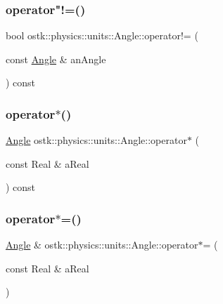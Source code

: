 \subsubsection{\texorpdfstring{operator"!=()}{operator!=()}}
{\footnotesize\ttfamily bool ostk\+::physics\+::units\+::\+Angle\+::operator!= (\begin{DoxyParamCaption}\item[{const \hyperlink{classostk_1_1physics_1_1units_1_1_angle}{Angle} \&}]{an\+Angle }\end{DoxyParamCaption}) const}

\mbox{\label{classostk_1_1physics_1_1units_1_1_angle_abd90998581807fadf43720f558061115}} 
\subsubsection{\texorpdfstring{operator$\ast$()}{operator*()}}
{\footnotesize\ttfamily \hyperlink{classostk_1_1physics_1_1units_1_1_angle}{Angle} ostk\+::physics\+::units\+::\+Angle\+::operator$\ast$ (\begin{DoxyParamCaption}\item[{const Real \&}]{a\+Real }\end{DoxyParamCaption}) const}

\mbox{\label{classostk_1_1physics_1_1units_1_1_angle_aba01c2eb2166f1be5c5ff8d5b2cb6363}} 
\subsubsection{\texorpdfstring{operator$\ast$=()}{operator*=()}}
{\footnotesize\ttfamily \hyperlink{classostk_1_1physics_1_1units_1_1_angle}{Angle} \& ostk\+::physics\+::units\+::\+Angle\+::operator$\ast$= (\begin{DoxyParamCaption}\item[{const Real \&}]{a\+Real }\end{DoxyParamCaption})}

